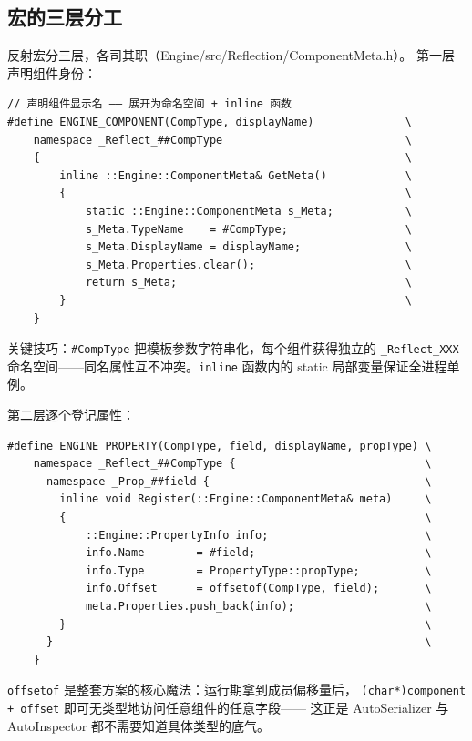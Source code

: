 \subsection{宏的三层分工}

反射宏分三层，各司其职（Engine/src/Reflection/ComponentMeta.h）。
第一层声明组件身份：

\begin{lstlisting}
// 声明组件显示名 —— 展开为命名空间 + inline 函数
#define ENGINE_COMPONENT(CompType, displayName)              \
    namespace _Reflect_##CompType                            \
    {                                                        \
        inline ::Engine::ComponentMeta& GetMeta()            \
        {                                                    \
            static ::Engine::ComponentMeta s_Meta;           \
            s_Meta.TypeName    = #CompType;                  \
            s_Meta.DisplayName = displayName;                \
            s_Meta.Properties.clear();                       \
            return s_Meta;                                   \
        }                                                    \
    }
\end{lstlisting}

关键技巧：\texttt{\#CompType} 把模板参数字符串化，每个组件获得独立的
\texttt{\_Reflect\_XXX} 命名空间——同名属性互不冲突。\texttt{inline}
函数内的 static 局部变量保证全进程单例。

第二层逐个登记属性：

\begin{lstlisting}
#define ENGINE_PROPERTY(CompType, field, displayName, propType) \
    namespace _Reflect_##CompType {                             \
      namespace _Prop_##field {                                 \
        inline void Register(::Engine::ComponentMeta& meta)     \
        {                                                       \
            ::Engine::PropertyInfo info;                        \
            info.Name        = #field;                          \
            info.Type        = PropertyType::propType;          \
            info.Offset      = offsetof(CompType, field);       \
            meta.Properties.push_back(info);                    \
        }                                                       \
      }                                                         \
    }
\end{lstlisting}

\texttt{offsetof} 是整套方案的核心魔法：运行期拿到成员偏移量后，
\texttt{(char*)component + offset} 即可无类型地访问任意组件的任意字段——
这正是 AutoSerializer 与 AutoInspector 都不需要知道具体类型的底气。

